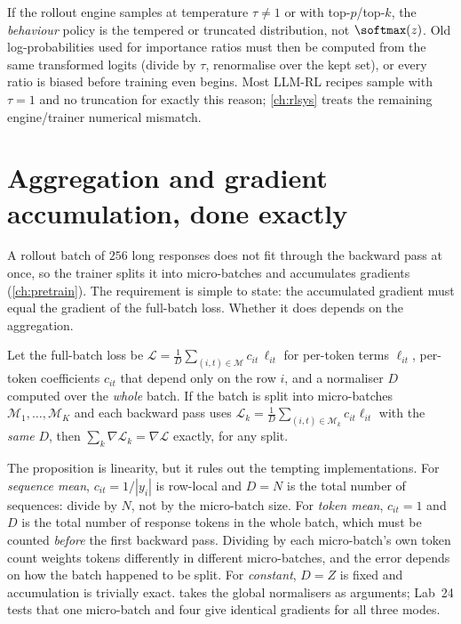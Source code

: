 \begin{pitfall}
If the rollout engine samples at temperature $\tau\neq1$ or with top-$p$/top-$k$, the
\emph{behaviour} policy is the tempered or truncated distribution, not $\softmax(z)$. Old
log-probabilities used for importance ratios must then be computed from the same
transformed logits (divide by $\tau$, renormalise over the kept set), or every ratio is
biased before training even begins. Most LLM-RL recipes sample with $\tau=1$ and no
truncation for exactly this reason; \cref{ch:rlsys} treats the remaining engine/trainer
numerical mismatch.
\end{pitfall}

\section{Aggregation and gradient accumulation, done exactly}\label{sec:pg:aggregation}

A rollout batch of $256$ long responses does not fit through the backward pass at once, so the
trainer splits it into micro-batches and accumulates gradients (\cref{ch:pretrain}). The
requirement is simple to state: the accumulated gradient must equal the gradient of the
full-batch loss. Whether it does depends on the aggregation.

\begin{proposition}\label{prop:pg:accum}
Let the full-batch loss be $\mathcal{L}=\frac{1}{D}\sum_{(i,t)\in\mathcal{M}}c_{it}\,\ell_{it}$
for per-token terms $\ell_{it}$, per-token coefficients $c_{it}$ that depend only on the row
$i$, and a normaliser $D$ computed over the \emph{whole} batch. If the batch is split into
micro-batches $\mathcal{M}_1,\dots,\mathcal{M}_K$ and each backward pass uses
$\mathcal{L}_k=\frac{1}{D}\sum_{(i,t)\in\mathcal{M}_k}c_{it}\ell_{it}$ with the \emph{same}
$D$, then $\sum_k\nabla\mathcal{L}_k=\nabla\mathcal{L}$ exactly, for any split.
\end{proposition}
The proposition is linearity, but it rules out the tempting implementations. For
\emph{sequence mean}, $c_{it}=1/|y_i|$ is row-local and $D=N$ is the total number of
sequences: divide by $N$, not by the micro-batch size. For \emph{token mean},
$c_{it}=1$ and $D$ is the total number of response tokens in the whole batch, which must
be counted \emph{before} the first backward pass. Dividing by each micro-batch's own token
count weights tokens differently in different micro-batches, and the error depends on how
the batch happened to be split. For \emph{constant}, $D=Z$ is fixed and accumulation is
trivially exact.  takes the global normalisers as arguments; Lab~24
tests that one micro-batch and four give identical gradients for all three modes.

